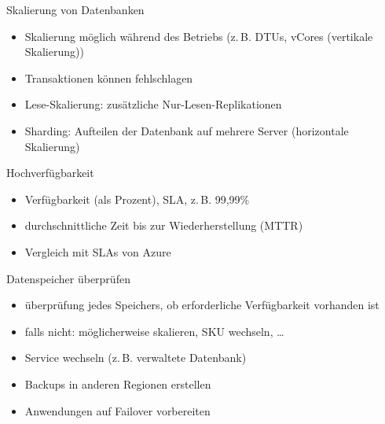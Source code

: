 \begin{flashcard}[]{Skalierung von Datenbanken}
  \begin{itemize}
    \item Skalierung möglich während des Betriebs (z.\,B. DTUs, vCores (vertikale Skalierung))
    \item[!] Transaktionen können fehlschlagen
    \item Lese-Skalierung: zusätzliche Nur-Lesen-Replikationen
    \item Sharding: Aufteilen der Datenbank auf mehrere Server (horizontale Skalierung)
  \end{itemize}
\end{flashcard}


\begin{flashcard}[]{Hochverfügbarkeit}
  \begin{itemize}
    \item Verfügbarkeit (als Prozent), SLA, z.\,B. 99,99\%
    \item durchschnittliche Zeit bis zur Wiederherstellung (MTTR)
    \item Vergleich mit SLAs von Azure
  \end{itemize}
\end{flashcard}

\begin{flashcard}[]{Datenspeicher überprüfen}
  \begin{itemize}
    \item überprüfung jedes Speichers, ob erforderliche Verfügbarkeit vorhanden ist
    \item falls nicht: möglicherweise skalieren, SKU wechseln, \ldots
    \item Service wechseln (z.\,B. verwaltete Datenbank)
    \item Backups in anderen Regionen erstellen
    \item Anwendungen auf Failover vorbereiten
  \end{itemize}
\end{flashcard}

